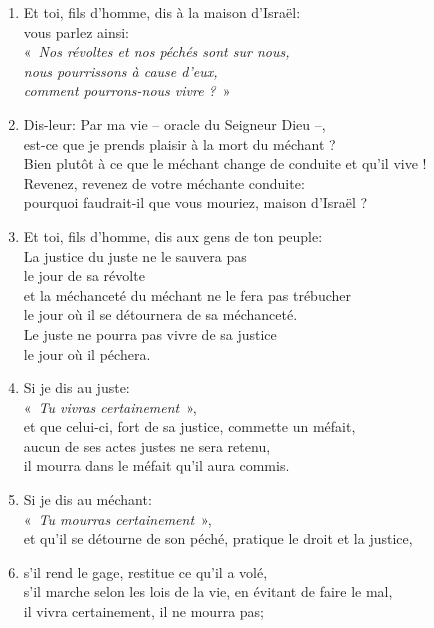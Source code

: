 \begin{enumerate}[leftmargin=\psleftmargin, labelsep = \pslabelsep, label={\arabic*}, font=\color{\pscolor}\small\textsuperscript, parsep=0em, itemsep=0em, topsep=0em ]
    \item Et toi, fils d’homme, dis à la maison d’Israël: \\ vous parlez ainsi: \\ \decalage «~\textit{Nos révoltes et nos péchés sont sur nous, \\ \decalage nous pourrissons à cause d’eux, \\ \decalage comment pourrons-nous vivre ?}~»
    \item Dis-leur: Par ma vie – oracle du Seigneur Dieu –, \\ est-ce que je prends plaisir à la mort du méchant ? \\ Bien plutôt à ce que le méchant change de conduite et qu’il vive ! \\ Revenez, revenez de votre méchante conduite: \\ pourquoi faudrait-il que vous mouriez, maison d’Israël ? \newpage
    \item Et toi, fils d’homme, dis aux gens de ton peuple: \\ \decalage La justice du juste ne le sauvera pas \\ \decalage \decalage le jour de sa révolte \\
    \decalage et la méchanceté du méchant ne le fera pas trébucher \\ \decalage \decalage le jour où il se détournera de sa méchanceté.\\
    \decalage Le juste ne pourra pas vivre de sa justice \\ \decalage \decalage le jour où il péchera.
    \item Si je dis au juste: \\ \decalage «~\textit{Tu vivras certainement}~», \\ et que celui-ci, fort de sa justice, commette un méfait, \\ aucun de ses actes justes ne sera retenu, \\ il mourra dans le méfait qu’il aura commis.
    \item Si je dis au méchant: \\ \decalage «~\textit{Tu mourras certainement}~», \\ et qu’il se détourne de son péché, pratique le droit et la justice,
    \item s’il rend le gage, restitue ce qu’il a volé, \\ s’il marche selon les lois de la vie, en évitant de faire le mal, \\ il vivra certainement, il ne mourra pas;

\end{enumerate}

